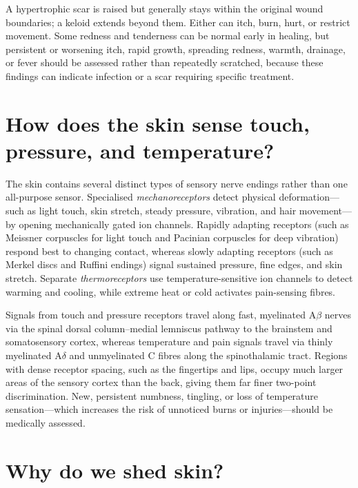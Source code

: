 \documentclass[11pt,oneside]{report}
\begin{document}
A hypertrophic scar is raised but generally stays within the original wound
boundaries; a keloid extends beyond them. Either can itch, burn, hurt, or
restrict movement. Some redness and tenderness can be normal early in healing,
but persistent or worsening itch, rapid growth, spreading redness, warmth,
drainage, or fever should be assessed rather than repeatedly scratched, because
these findings can indicate infection or a scar requiring specific treatment.

\section{How does the skin sense touch, pressure, and temperature?}

The skin contains several distinct types of sensory nerve endings rather than
one all-purpose sensor. Specialised \emph{mechanoreceptors} detect physical
deformation---such as light touch, skin stretch, steady pressure, vibration,
and hair movement---by opening mechanically gated ion channels. Rapidly adapting
receptors (such as Meissner corpuscles for light touch and Pacinian corpuscles
for deep vibration) respond best to changing contact, whereas slowly adapting
receptors (such as Merkel discs and Ruffini endings) signal sustained pressure,
fine edges, and skin stretch. Separate \emph{thermoreceptors} use
temperature-sensitive ion channels to detect warming and cooling, while extreme
heat or cold activates pain-sensing fibres.

Signals from touch and pressure receptors travel along fast, myelinated A$\beta$
nerves via the spinal dorsal column--medial lemniscus pathway to the brainstem
and somatosensory cortex, whereas temperature and pain signals travel via
thinly myelinated A$\delta$ and unmyelinated C fibres along the spinothalamic
tract. Regions
with dense receptor spacing, such as the fingertips and lips, occupy much larger
areas of the sensory cortex than the back, giving them far finer two-point
discrimination. New, persistent numbness, tingling, or loss of temperature
sensation---which increases the risk of unnoticed burns or injuries---should be
medically assessed.

\section{Why do we shed skin?}
\end{document}
